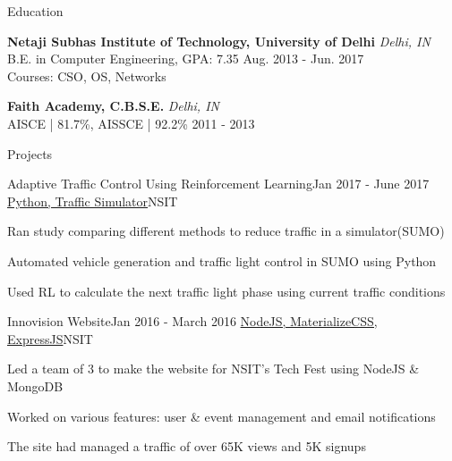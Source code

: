 \documentclass{resume} %
\begin{document}

\begin{rSection}{ Education }

    {\bf Netaji Subhas Institute of Technology, University of Delhi} \hfill {\em Delhi, IN} 
    \\ B.E. in Computer Engineering, GPA: 7.35 \hfill { Aug. 2013 - Jun. 2017 }
    \\ {Courses}: CSO, OS, Networks \smallskip

    {\bf Faith Academy, C.B.S.E.} \hfill {\em Delhi, IN}
    \\ AISCE | 81.7\%, AISSCE | 92.2\% \hfill { 2011 - 2013 }

\end{rSection}

\begin{rSection}{Projects}

    \begin{rSubsection}{Adaptive Traffic Control Using Reinforcement Learning}{Jan 2017 - June 2017}
    {\href{https://github.com/rohit-smpx/trafficRL}{Python, Traffic Simulator}}{NSIT}

        \item Ran study comparing different methods to reduce traffic in a simulator(SUMO)
        \item Automated vehicle generation and traffic light control in SUMO using Python
        \item Used RL to calculate the next traffic light phase using current traffic conditions
    \end{rSubsection}

    \begin{rSubsection}{Innovision Website}{Jan 2016 - March 2016}
    {\href{https://github.com/rohit-smpx/inno}{NodeJS, MaterializeCSS, ExpressJS}}{NSIT}

        \item Led a team of 3 to make the website for NSIT’s Tech Fest using NodeJS \& MongoDB
        \item Worked on various features: user \& event management and email notifications
        \item The site had managed a traffic of over 65K views and 5K signups
    \end{rSubsection}

\end{rSection}
\end{document}
